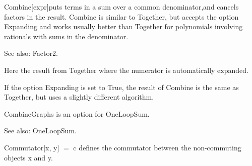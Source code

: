 




Combine[expr]puts terms in a sum over a common denominator,and cancels factors in the result. Combine is similar to Together, but accepts
  the option Expanding and works usually better than Together for polynomials involving rationals with sums in the denominator.



See also:  Factor2.




Here the result from Together where the numerator is automatically expanded.



If the option Expanding is set to True, the result of Combine is the same as Together, but uses a slightly different algorithm.





CombineGraphs is an option for OneLoopSum.

See also: { }OneLoopSum.



Commutator[x, y] \(=\) c defines the commutator between the non-commuting objects x and y.

